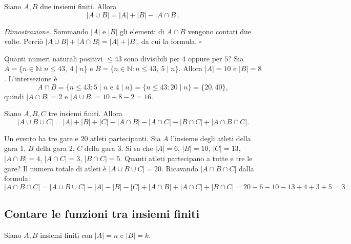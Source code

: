 \documentclass[11pt,a4paper]{article}
\begin{document}
\begin{proposizione}
Siano $A, B$ due insiemi finiti. Allora
\[
|A \cup B| = |A| + |B| - |A \cap B|.
\]
\end{proposizione}

\emph{Dimostrazione.} Sommando $|A|$ e $|B|$ gli elementi di $A \cap B$ vengono contati due volte. Perciò $|A \cup B| + |A \cap B| = |A| + |B|$, da cui la formula. \hfill $\square$

\begin{esempio}
Quanti numeri naturali positivi $\le 43$ sono divisibili per $4$ oppure per $5$?
Sia $A = \{n \in \mathbb{N} : n \le 43,\ 4 \mid n\}$ e $B = \{n \in \mathbb{N} : n \le 43,\ 5 \mid n\}$. Allora $|A| = 10$ e $|B| = 8$. L'intersezione è
\[
A \cap B = \{n \le 43 : 5 \mid n \text{ e } 4 \mid n\} = \{n \le 43 : 20 \mid n\} = \{20, 40\},
\]
quindi $|A \cap B| = 2$ e $|A \cup B| = 10 + 8 - 2 = 16$.
\end{esempio}

\begin{proposizione}
Siano $A, B, C$ tre insiemi finiti. Allora
\[
|A \cup B \cup C| = |A| + |B| + |C| - |A \cap B| - |A \cap C| - |B \cap C| + |A \cap B \cap C|.
\]
\end{proposizione}

\begin{esempio}
Un evento ha tre gare e $20$ atleti partecipanti. Sia $A$ l'insieme degli atleti della gara $1$, $B$ della gara $2$, $C$ della gara $3$. Si sa che $|A| = 6$, $|B| = 10$, $|C| = 13$, $|A \cap B| = 4$, $|A \cap C| = 3$, $|B \cap C| = 5$. Quanti atleti partecipano a tutte e tre le gare?
Il numero totale di atleti è $|A \cup B \cup C| = 20$. Ricavando $|A \cap B \cap C|$ dalla formula:
\[
|A \cap B \cap C| = |A \cup B \cup C| - |A| - |B| - |C| + |A \cap B| + |A \cap C| + |B \cap C| = 20 - 6 - 10 - 13 + 4 + 3 + 5 = 3.
\]
\end{esempio}

\subsection{Contare le funzioni tra insiemi finiti}

Siano $A, B$ insiemi finiti con $|A| = n$ e $|B| = k$.
\end{document}

